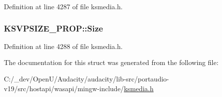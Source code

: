 Definition at line 4287 of file ksmedia.\+h.

\subsubsection[{\texorpdfstring{Size}{Size}}]{ K\+S\+V\+P\+S\+I\+Z\+E\+\_\+\+P\+R\+O\+P\+::\+Size}\hypertarget{struct_k_s_v_p_s_i_z_e___p_r_o_p_ac64aded94f3ae644b8bbb6f0290fd95a}{}\label{struct_k_s_v_p_s_i_z_e___p_r_o_p_ac64aded94f3ae644b8bbb6f0290fd95a}


Definition at line 4288 of file ksmedia.\+h.



The documentation for this struct was generated from the following file\+:\begin{DoxyCompactItemize}
\item 
C\+:/\+\_\+dev/\+Open\+U/\+Audacity/audacity/lib-\/src/portaudio-\/v19/src/hostapi/wasapi/mingw-\/include/\hyperlink{ksmedia_8h}{ksmedia.\+h}\end{DoxyCompactItemize}
